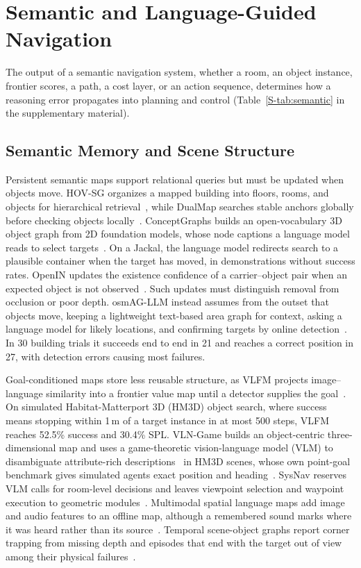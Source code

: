 \section{Semantic and Language-Guided Navigation}
\label{sec:semantic}

The output of a semantic navigation system, whether a room, an object instance, frontier scores, a path, a cost layer, or an action sequence, determines how a reasoning error propagates into planning and control (Table~\ref{S-tab:semantic} in the supplementary material).

\subsection{Semantic Memory and Scene Structure}

Persistent semantic maps support relational queries but must be updated when objects move. HOV-SG organizes a mapped building into floors, rooms, and objects for hierarchical retrieval~\cite{P_E48}, while DualMap searches stable anchors globally before checking objects locally~\cite{P_M02}. ConceptGraphs builds an open-vocabulary 3D object graph from 2D foundation models, whose node captions a language model reads to select targets~\cite{P_K15}. On a Jackal, the language model redirects search to a plausible container when the target has moved, in demonstrations without success rates. OpenIN updates the existence confidence of a carrier--object pair when an expected object is not observed~\cite{P_E44}. Such updates must distinguish removal from occlusion or poor depth. osmAG-LLM instead assumes from the outset that objects move, keeping a lightweight text-based area graph for context, asking a language model for likely locations, and confirming targets by online detection~\cite{P_R27}. In 30 building trials it succeeds end to end in 21 and reaches a correct position in 27, with detection errors causing most failures.

Goal-conditioned maps store less reusable structure, as VLFM projects image--language similarity into a frontier value map until a detector supplies the goal~\cite{P_E47}. On simulated Habitat-Matterport 3D (HM3D) object search, where success means stopping within 1\,m of a target instance in at most 500 steps, VLFM reaches 52.5\% success and 30.4\% SPL. VLN-Game builds an object-centric three-dimensional map and uses a game-theoretic vision-language model (VLM) to disambiguate attribute-rich descriptions~\cite{P_R28} in HM3D scenes, whose own point-goal benchmark gives simulated agents exact position and heading~\cite{P_K11}. SysNav reserves VLM calls for room-level decisions and leaves viewpoint selection and waypoint execution to geometric modules~\cite{P_E41}. Multimodal spatial language maps add image and audio features to an offline map, although a remembered sound marks where it was heard rather than its source~\cite{P_S12}. Temporal scene-object graphs report corner trapping from missing depth and episodes that end with the target out of view among their physical failures~\cite{P_S13}.

